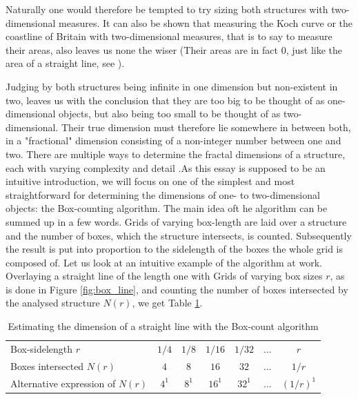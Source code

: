 \documentclass{article}[12pt]
\begin{document}
Naturally one would therefore be tempted to try sizing both structures with two-dimensional measures. It can also be shown that measuring the Koch curve or the coastline of Britain with two-dimensional measures, that is to say to measure their areas, also leaves us none the wiser (Their areas are in fact $0$, just like the area of a straight line, see \cite{falconer2013fractals}).

Judging by both structures being infinite in one dimension but non-existent in two, leaves us with the conclusion that they are too big to be thought of as one-dimensional objects, but also being too small to be thought of as two-dimensional. Their true dimension must therefore lie somewhere in between both, in a "fractional" dimension consisting of a non-integer number between one and two.
There are multiple ways to determine the fractal dimensions of a structure, each with varying complexity and detail \citep{falconer1986geometry}.As this essay is supposed to be an intuitive introduction, we will focus on one of the simplest and most straightforward for determining the dimensions of one- to two-dimensional objects: the Box-counting algorithm.
The main idea oft he algorithm can be summed up in a few words. Grids of varying box-length are laid over a structure and the number of boxes, which the structure intersects, is counted. Subsequently the result is put into proportion to the sidelength of the boxes the whole grid is composed of.
Let us look at an intuitive example of the algorithm at work. Overlaying a straight line of the length one with Grids of varying box sizes $r$, as is done in Figure \ref{fig:box_line}, and counting the number of boxes intersected by the analysed structure $N(r)$, we get Table \ref{table:box_line}.

\begin{table}[!ht]
\begin{tabular}{p{3cm}cccccc}
&&&&&&\\
\hline
\hline
Box-sidelength $r$ &  $1/4$ & $1/8$ & $1/16$ &  $1/32$ & $...$ & $r$\\
\hline
Boxes  \newline intersected $N(r)$ & $4$ & $8$ & $16$ & $32$ & $...$ & $1/r$\\
Alternative \newline expression of $N(r)$ & $ 4^1$ & $8^1$  & $16^1$  & $32^1$ & $...$ & $(1/r)^1$ \\
\hline
\hline
\end{tabular}
\caption{Estimating the dimension of a straight line with the Box-count algorithm}
\label{table:box_line}
\end{table}
\end{document}
